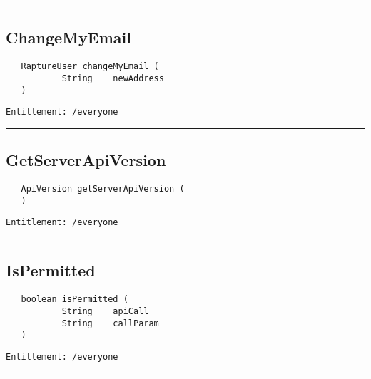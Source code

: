 \rule{12cm}{2pt}
\subsection{ChangeMyEmail}
\label{Api:ChangeMyEmail}
\begin{verbatim}
   RaptureUser changeMyEmail (
           String    newAddress
   )
\end{verbatim}
\begin{Verbatim}[fontsize=\small, formatcom=\color{Maroon}]
  Entitlement: /everyone
\end{Verbatim}



\rule{12cm}{2pt}
\subsection{GetServerApiVersion}
\label{Api:GetServerApiVersion}
\begin{verbatim}
   ApiVersion getServerApiVersion (
   )
\end{verbatim}
\begin{Verbatim}[fontsize=\small, formatcom=\color{Maroon}]
  Entitlement: /everyone
\end{Verbatim}



\rule{12cm}{2pt}
\subsection{IsPermitted}
\label{Api:IsPermitted}
\begin{verbatim}
   boolean isPermitted (
           String    apiCall
           String    callParam
   )
\end{verbatim}
\begin{Verbatim}[fontsize=\small, formatcom=\color{Maroon}]
  Entitlement: /everyone
\end{Verbatim}



\rule{12cm}{2pt}
